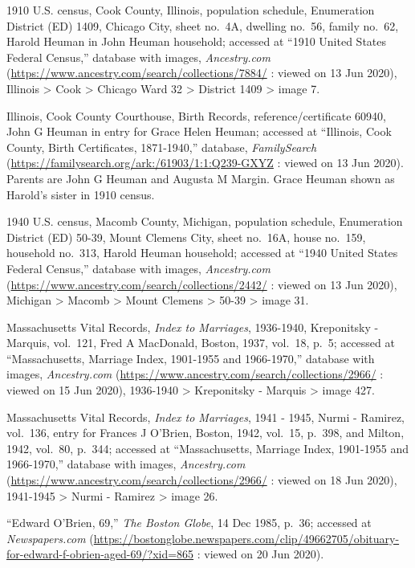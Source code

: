 \begin{thebibliography}{999}
1910 U.S. census, Cook County, Illinois, population schedule, Enumeration District (ED) 1409, Chicago City, sheet no.\ 4A, dwelling no.\ 56, family no.\ 62, Harold Heuman in John Heuman household; accessed at ``1910 United States Federal Census,'' database with images, \textit{Ancestry.com} (\url{https://www.ancestry.com/search/collections/7884/} : viewed on 13 Jun 2020), Illinois > Cook > Chicago Ward 32 > District 1409 > image 7.

Illinois, Cook County Courthouse, Birth Records, reference/certificate 60940, John G Heuman in entry for Grace Helen Heuman; accessed at ``Illinois, Cook County, Birth Certificates, 1871-1940,'' database, \textit{FamilySearch} (\url{https://familysearch.org/ark:/61903/1:1:Q239-GXYZ} : viewed on 13 Jun 2020).\\
Parents are John G Heuman and Augusta M Margin. Grace Heuman shown as Harold's sister in 1910 census.

1940 U.S. census, Macomb County, Michigan, population schedule, Enumeration District (ED) 50-39, Mount Clemens City, sheet no.\ 16A, house no.\ 159, household no.\ 313, Harold Heuman household; accessed at ``1940 United States Federal Census,'' database with images, \textit{Ancestry.com} (\url{https://www.ancestry.com/search/collections/2442/} : viewed on 13 Jun 2020), Michigan > Macomb > Mount Clemens > 50-39 > image 31.

Massachusetts Vital Records, \textit{Index to Marriages}, 1936-1940, Kreponitsky - Marquis, vol.\ 121, Fred A MacDonald, Boston, 1937, vol.\ 18, p.\ 5; accessed at ``Massachusetts, Marriage Index, 1901-1955 and 1966-1970,'' database with images, \textit{Ancestry.com} (\url{https://www.ancestry.com/search/collections/2966/} : viewed on 15 Jun 2020), 1936-1940 > Kreponitsky - Marquis > image 427.

Massachusetts Vital Records, \textit{Index to Marriages}, 1941 - 1945, Nurmi - Ramirez, vol.\ 136, entry for Frances J O'Brien, Boston, 1942, vol.\ 15, p.\ 398, and Milton, 1942, vol.\ 80, p.\ 344;  accessed at ``Massachusetts, Marriage Index, 1901-1955 and 1966-1970,'' database with images, \textit{Ancestry.com} (\url{https://www.ancestry.com/search/collections/2966/} : viewed on 18 Jun 2020), 1941-1945 > Nurmi - Ramirez > image 26.

``Edward O'Brien, 69,'' \textit{The Boston Globe}, 14 Dec 1985, p.\ 36; accessed at \textit{Newspapers.com} (\url{https://bostonglobe.newspapers.com/clip/49662705/obituary-for-edward-f-obrien-aged-69/?xid=865} : viewed on 20 Jun 2020).


\end{thebibliography}
